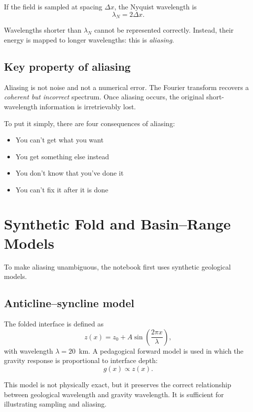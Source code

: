 \documentclass[11pt,a4paper]{article}
\begin{document}
If the field is sampled at spacing $\Delta x$, the Nyquist wavelength is
\begin{equation}
\lambda_N = 2 \Delta x .
\end{equation}

Wavelengths shorter than $\lambda_N$ cannot be represented correctly.
Instead, their energy is mapped to longer wavelengths:
this is \emph{aliasing}.

\subsection{Key property of aliasing}

Aliasing is not noise and not a numerical error.  The Fourier transform recovers a \emph{coherent but incorrect} spectrum.  Once aliasing occurs, the original short-wavelength information is irretrievably lost.

To put it simply, there are four consequences of aliasing:
\begin{itemize}
  \item You can't get what you want
  \item You get something else instead
  \item You don't know that you've done it
  \item You can't fix it after it is done
\end{itemize}

\section{Synthetic Fold and Basin--Range Models}

To make aliasing unambiguous, the notebook first uses synthetic geological models.

\subsection{Anticline--syncline model}

The folded interface is defined as
\begin{equation}
z(x) = z_0 + A \sin\!\left(\frac{2\pi x}{\lambda}\right),
\end{equation}
with wavelength $\lambda = 20$~km.
A pedagogical forward model is used in which the gravity response is proportional
to interface depth:
\begin{equation}
g(x) \propto z(x).
\end{equation}

This model is not physically exact, but it preserves the correct relationship between
geological wavelength and gravity wavelength.
It is sufficient for illustrating sampling and aliasing.
\end{document}
